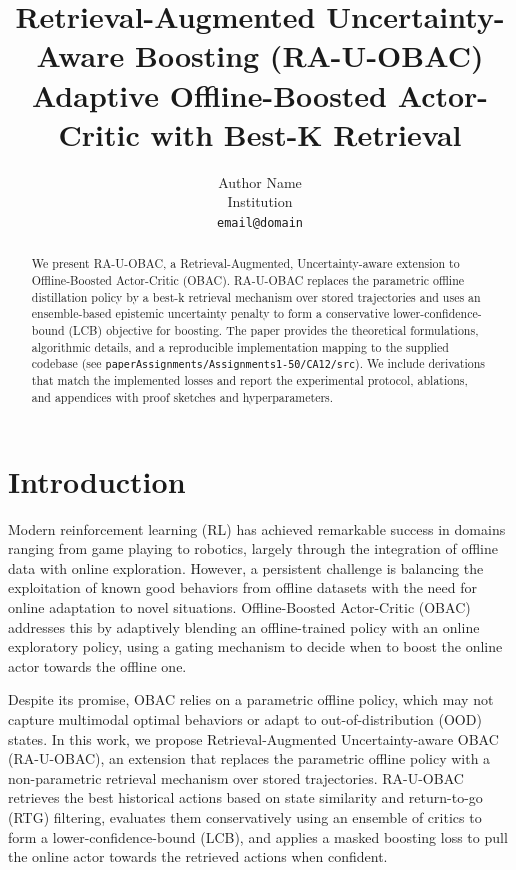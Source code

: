 \documentclass{article}
\title{Retrieval-Augmented Uncertainty-Aware Boosting (RA-U-OBAC)\\
Adaptive Offline-Boosted Actor-Critic with Best-K Retrieval}
\author{%
  Author Name \\
  Institution \\
  \texttt{email@domain} \\
}
\begin{document}
\maketitle

\begin{abstract}
We present RA-U-OBAC, a Retrieval-Augmented, Uncertainty-aware extension to Offline-Boosted Actor-Critic (OBAC).
RA-U-OBAC replaces the parametric offline distillation policy by a best-k retrieval mechanism over stored
trajectories and uses an ensemble-based epistemic uncertainty penalty to form a conservative lower-confidence-bound
(LCB) objective for boosting. The paper provides the theoretical formulations, algorithmic details, and a reproducible
implementation mapping to the supplied codebase (see \texttt{paperAssignments/Assignments1-50/CA12/src}). We include
derivations that match the implemented losses and report the experimental protocol, ablations, and appendices with
proof sketches and hyperparameters.
\end{abstract}

\section{Introduction}
\label{sec:intro}

Modern reinforcement learning (RL) has achieved remarkable success in domains ranging from game playing to robotics, largely through the integration of offline data with online exploration. However, a persistent challenge is balancing the exploitation of known good behaviors from offline datasets with the need for online adaptation to novel situations. Offline-Boosted Actor-Critic (OBAC) \cite{obac2024} addresses this by adaptively blending an offline-trained policy with an online exploratory policy, using a gating mechanism to decide when to boost the online actor towards the offline one.

Despite its promise, OBAC relies on a parametric offline policy, which may not capture multimodal optimal behaviors or adapt to out-of-distribution (OOD) states. In this work, we propose Retrieval-Augmented Uncertainty-aware OBAC (RA-U-OBAC), an extension that replaces the parametric offline policy with a non-parametric retrieval mechanism over stored trajectories. RA-U-OBAC retrieves the best historical actions based on state similarity and return-to-go (RTG) filtering, evaluates them conservatively using an ensemble of critics to form a lower-confidence-bound (LCB), and applies a masked boosting loss to pull the online actor towards the retrieved actions when confident.
\end{document}
